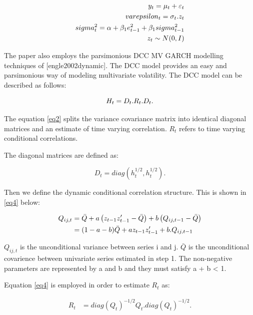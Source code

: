 \documentclass[11pt,preprint, authoryear]{elsarticle}
\numberwithin{equation}{section}
\numberwithin{figure}{section}
\numberwithin{table}{section}
\begin{document}
\begin{align}  
y_t = \mu_t + \varepsilon_t \label{eq1} \\ \notag 
    varepsilon_t = \sigma_t.z_t \\ \notag 
  sigma_t^{2} = \alpha + \beta_1 e_{t-1}^2 + \beta_1          sigma_{t-1}^2 \\ \notag
z_t \sim  N(0,I) \notag
\end{align}

The paper also employs the parsimonious DCC MV GARCH modelling
techniques of {[}engle2002dynamic{]}. The DCC model provides an easy and
parsimonious way of modeling multivariate volatility. The DCC model can
be described as follows:

\begin{equation} \label{eq2}
H_t = D_t.R_t.D_t.\\ \notag
\end{equation}

The equation \ref{eq2} splits the variance covariance matrix into
identical diagonal matrices and an estimate of time varying correlation.
\(R_t\) refers to time varying conditional correlations.

The diagonal matrices are defined as:

\begin {equation} \label {eq3}
D_t = diag(h_t^{1/2}, h_t^{1/2}).
 \end{equation}

Then we define the dynamic conditional correlation structure. This is
shown in \ref{eq4} below:

\begin{align}  \label{eq4}
Q_{ij,t} &= \bar Q + a\left(z_{t - 1}z'_{t - 1} - \bar{Q} \right) + b\left( Q_{ij, t - 1} - \bar{Q} \right) \hfill \\ \notag  &= (1 - a - b)\bar{Q} + az_{t - 1}z'_{t - 1} + b.Q_{ij, t - 1} \notag
\end{align}

\(Q_{ij,t}\) is the unconditional variance between series i and j.
\(\bar{Q}\) is the unconditional covarience between univariate series
estimated in step 1. The non-negative parameters are represented by a
and b and they must satisfy a + b \textless{} 1.

Equation \ref{eq4} is employed in order to estimate \(R_t\) as:

\begin{align}\label{eq5}
R_t &= diag(Q_t)^{-1/2}Q_t.diag(Q_t)^{-1/2}. 
\end{align}
\end{document}
